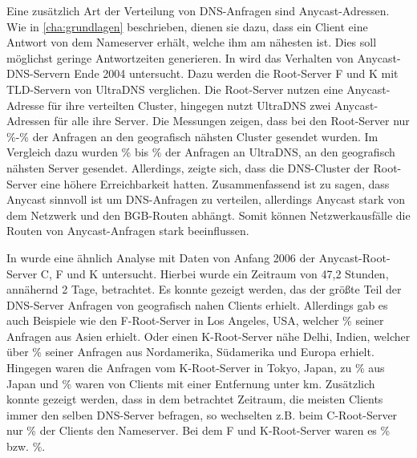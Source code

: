 \documentclass[a4paper, 12pt, BCOR10mm, DIV12, toc=bibliography, toc=listof, german]{scrbook}
\begin{document}
	Eine zusätzlich Art der Verteilung von DNS-Anfragen sind Anycast-Adressen. Wie in
	\ref{cha:grundlagen} beschrieben, dienen sie dazu, dass ein Client eine Antwort von dem Nameserver
	erhält, welche ihm am nähesten ist. Dies soll möglichst geringe Antwortzeiten generieren. In \cite{sapate2005}
	wird das Verhalten von Anycast-DNS-Servern Ende 2004 untersucht. Dazu werden die
	Root-Server F und K mit TLD-Servern von UltraDNS verglichen. Die Root-Server nutzen eine
	Anycast-Adresse für ihre verteilten Cluster, hingegen nutzt UltraDNS zwei Anycast-Adressen für
	alle ihre Server. Die Messungen zeigen, dass bei den Root-Server nur \unit[15]{\%}-\unit[27]{\%}
	der Anfragen an den	geografisch nähsten Cluster gesendet wurden. Im Vergleich dazu wurden
	\unit[45]{\%} bis \unit[53]{\%} der	Anfragen an UltraDNS, an den geografisch nähsten Server gesendet.
	Allerdings, zeigte sich, dass die	DNS-Cluster der Root-Server eine höhere Erreichbarkeit hatten. Zusammenfassend
	ist zu sagen, dass Anycast sinnvoll ist um DNS-Anfragen zu verteilen, allerdings Anycast stark von dem
	Netzwerk und den BGB-Routen abhängt. Somit können Netzwerkausfälle die Routen von Anycast-Anfragen stark
	beeinflussen.

	In \cite{lietal2007} wurde eine ähnlich Analyse mit Daten von Anfang 2006 der Anycast-Root-Server
	C, F und K untersucht.  Hierbei wurde ein Zeitraum von 47,2 Stunden, annähernd 2 Tage, betrachtet.
	Es konnte gezeigt werden, das der größte Teil der DNS-Server Anfragen von geografisch nahen
	Clients erhielt.  Allerdings gab es auch Beispiele wie den F-Root-Server in Los Angeles, USA,
	welcher \unit[88]{\%} seiner Anfragen aus Asien erhielt. Oder einen K-Root-Server nähe Delhi, Indien,
	welcher über \unit[75]{\%} seiner Anfragen aus Nordamerika, Südamerika und Europa erhielt.
	Hingegen waren die Anfragen vom K-Root-Server in Tokyo, Japan, zu \unit[99,7]{\%} aus Japan
	und \unit[75]{\%} waren von Clients mit einer Entfernung unter \unit[1000]{km}. Zusätzlich
	konnte gezeigt werden, dass in dem betrachtet Zeitraum, die meisten Clients immer den
	selben DNS-Server befragen, so wechselten z.B. beim C-Root-Server nur \unit[1,7]{\%} der
	Clients den Nameserver. Bei dem F und K-Root-Server waren es \unit[1,4]{\%} bzw.
	\unit[4,7]{\%}.
\end{document}
